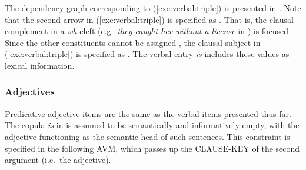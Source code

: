 



\noindent The dependency graph corresponding to
(\ref{exe:verbal:triple}) is presented in
. Note that the second arrow in
(\ref{exe:verbal:triple}) is specified as . That is, the
clausal complement in a \textit{wh}-cleft (e.g.\ \textit{they caught
  her without a license} in ) is focused
\citep{kim:07}. Since the other constituents cannot be
assigned , the clausal subject in (\ref{exe:verbal:triple}) is
specified as . The verbal entry \textit{is} includes
these values as lexical information.







\subsubsection{Adjectives}
\label{10:sssec:adjectives}


Predicative adjective items are the same as the verbal items presented
thus far. The copula \textit{is} in  is assumed
to be semantically and informatively empty, with the adjective
functioning as the semantic head of such sentences. This constraint is
specified in the following AVM, which passes up the CLAUSE-KEY of the
second argument (i.e.\ the adjective).



